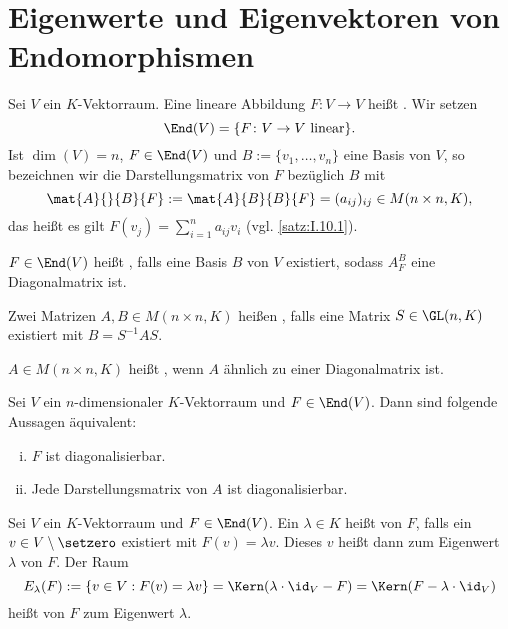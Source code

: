 \section{Eigenwerte und Eigenvektoren von Endomorphismen}

\setcounter{definition}{1}
\begin{definition}
	\label{def:I.16.2}
	Sei $V$ ein $K$-Vektorraum.
	Eine lineare Abbildung $F \colon V \rightarrow V$ heißt .
	Wir setzen
	\[
		\End(V) = \{F \colon V \rightarrow V \text{ linear}\}.
	\]
	Ist $\dim(V) = n$, $F \in \End(V)$ und $B := \{v_1,\dots,v_n\}$ eine Basis von $V$, so bezeichnen wir die Darstellungsmatrix von $F$ bezüglich $B$ mit
	\[
		\mat{A}{}{B}{F} := \mat{A}{B}{B}{F} = (a_{ij})_{ij} \in M(n \times n,K),
	\]
	das heißt es gilt $F(v_j) = \sum\limits_{i=1}^{n} a_{ij}v_i$ (vgl. \autoref{satz:I.10.1}).
	
	$F \in \End(V)$ heißt , falls eine Basis $B$ von $V$ existiert, sodass $A^B_F$ eine Diagonalmatrix ist.
\end{definition}

\begin{definition}
	\label{def:I.16.3}
	Zwei Matrizen $A,B \in M(n \times n,K)$ heißen , falls eine Matrix $S \in \GL(n,K)$ existiert mit $B = S^{-1}AS$.
	
	$A \in M(n\times n,K)$ heißt , wenn $A$ ähnlich zu einer Diagonalmatrix ist.
\end{definition}

\begin{satz}
	\label{satz:I.16.4}
	Sei $V$ ein $n$-dimensionaler $K$-Vektorraum und $F \in \End(V)$.
	Dann sind folgende Aussagen äquivalent:
	\begin{enumerate}[(i)]
		\item $F$ ist diagonalisierbar.
		\item Jede Darstellungsmatrix von $A$ ist diagonalisierbar.
	\end{enumerate}
\end{satz}

\setcounter{definition}{6}
\begin{definition}
	\label{def:I.16.7}
	Sei $V$ ein $K$-Vektorraum und $F \in \End(V)$.
	Ein $\lambda \in K$ heißt  von $F$, falls ein $v \in V \setminus \setzero$ existiert mit $F(v) = \lambda v$.
	Dieses $v$ heißt dann  zum Eigenwert $\lambda$ von $F$.
	Der Raum
	\[
		E_\lambda(F) := \{v \in V : F(v) = \lambda v\} = \Kern(\lambda \cdot \id_V - F) = \Kern(F - \lambda \cdot \id_V)
	\]
	heißt  von $F$ zum Eigenwert $\lambda$.
\end{definition}

